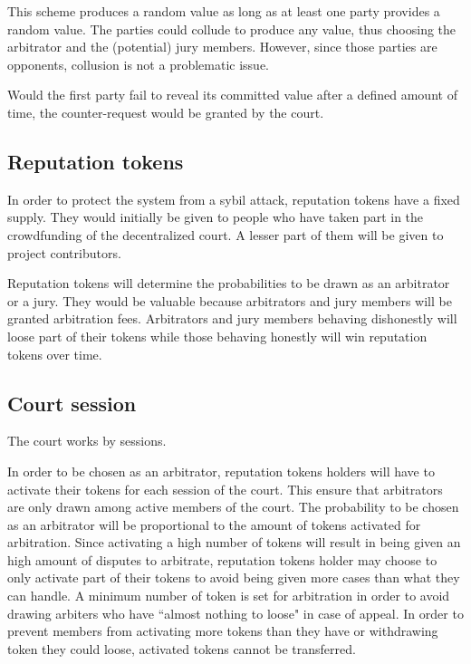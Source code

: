 \documentclass[12 pt]{article}
\begin{document}
This scheme produces a random value as long as at least one party provides a random value. The parties could collude to produce any value, thus choosing the arbitrator and the (potential) jury members. However, since those parties are opponents, collusion is not a problematic issue.

Would the first party fail to reveal its committed value after a defined amount of time, the counter-request would be granted by the court.

\subsection{Reputation tokens}
In order to protect the system from a sybil attack\cite{sybil}, reputation tokens have a fixed supply. They would initially be given to people who have taken part in the crowdfunding of the decentralized court. A lesser part of them will be given to project contributors.

Reputation tokens will determine the probabilities to be drawn as an arbitrator or a jury. They would be valuable because arbitrators and jury members will be granted arbitration fees.
Arbitrators and jury members behaving dishonestly will loose part of their tokens while those behaving honestly will win reputation tokens over time.

\subsection{Court session}

The court works by sessions.

In order to be chosen as an arbitrator, reputation tokens holders will have to activate their tokens for each session of the court. This ensure that arbitrators are only drawn among active members of the court. The probability to be chosen as an arbitrator will be proportional to the amount of tokens activated for arbitration. Since activating a high number of tokens will result in being given an high amount of disputes to arbitrate, reputation tokens holder may choose to only activate part of their tokens to avoid being given more cases than what they can handle. A minimum number of token is set for arbitration in order to avoid drawing arbiters who have ``almost nothing to loose" in case of appeal.
In order to prevent members from activating more tokens than they have or withdrawing token they could loose, activated tokens cannot be transferred.
\end{document}
